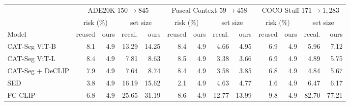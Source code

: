 \setlength{\tabcolsep}{4pt}\begin{tabular}{@{}lrrrrrrrrrrrr@{}}
\toprule
& \multicolumn{4}{c}{ADE20K $150\!\to\!845$} & \multicolumn{4}{c}{Pascal Context $59\!\to\!458$} & \multicolumn{4}{c}{COCO-Stuff $171\!\to\!1{,}283$} \\
\cmidrule(lr){2-5}\cmidrule(lr){6-9}\cmidrule(l){10-13}
& \multicolumn{2}{c}{risk (\%)} & \multicolumn{2}{c}{set size} & \multicolumn{2}{c}{risk (\%)} & \multicolumn{2}{c}{set size} & \multicolumn{2}{c}{risk (\%)} & \multicolumn{2}{c}{set size} \\
\cmidrule(lr){2-3}\cmidrule(lr){4-5}\cmidrule(lr){6-7}\cmidrule(lr){8-9}\cmidrule(lr){10-11}\cmidrule(l){12-13}
Model & reused & ours & recal. & ours & reused & ours & recal. & ours & reused & ours & recal. & ours \\
\midrule
CAT-Seg ViT-B & 8.1 & 4.9 & 13.29 & 14.25 & 8.4 & 4.9 & 4.66 & 4.95 & 6.9 & 4.9 & 5.96 & 7.12 \\
CAT-Seg ViT-L & 8.4 & 4.9 & 7.81 & 8.63 & 8.5 & 4.9 & 3.38 & 3.66 & 6.9 & 4.9 & 4.89 & 5.75 \\
CAT-Seg + DeCLIP & 7.9 & 4.9 & 7.64 & 8.74 & 8.4 & 4.9 & 3.58 & 3.85 & 6.8 & 4.9 & 4.84 & 5.67 \\
SED & 3.8 & 4.9 & 16.19 & 15.62 & 2.1 & 4.9 & 4.63 & 4.77 & 1.6 & 4.9 & 6.47 & 6.17 \\
FC-CLIP & 6.8 & 4.9 & 25.65 & 31.19 & 8.6 & 4.9 & 12.77 & 13.99 & 9.8 & 4.9 & 82.70 & 77.21 \\
\bottomrule
\end{tabular}
